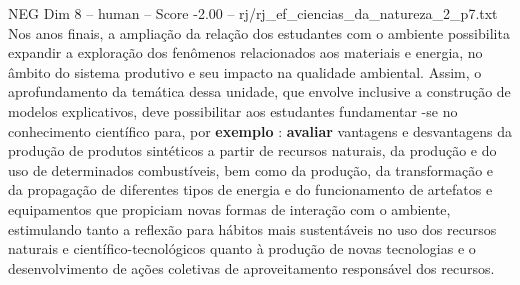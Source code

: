 \begin{textsample}{NEG Dim 8 – human – Score -2.00 – rj/rj\_ef\_ciencias\_da\_natureza\_2\_p7.txt}  \label{ex:f8_neg_005}
Nos anos finais, a ampliação da relação dos estudantes com o ambiente possibilita expandir a exploração dos fenômenos relacionados aos materiais e energia, no âmbito do sistema produtivo e seu impacto na qualidade ambiental.
Assim, o aprofundamento da temática dessa unidade, que envolve inclusive a construção de modelos explicativos, deve possibilitar aos estudantes fundamentar -se no conhecimento científico para, por \textbf{exemplo} : \textbf{avaliar} vantagens e desvantagens da produção de produtos sintéticos a partir de recursos naturais, da produção e do uso de determinados combustíveis, bem como da produção, da transformação e da propagação de diferentes tipos de energia e do funcionamento de artefatos e equipamentos que propiciam novas formas de interação com o ambiente, estimulando tanto a reflexão para hábitos mais sustentáveis no uso dos recursos naturais e científico-tecnológicos quanto à produção de novas tecnologias e o desenvolvimento de ações coletivas de aproveitamento responsável dos recursos.

\end{textsample}
